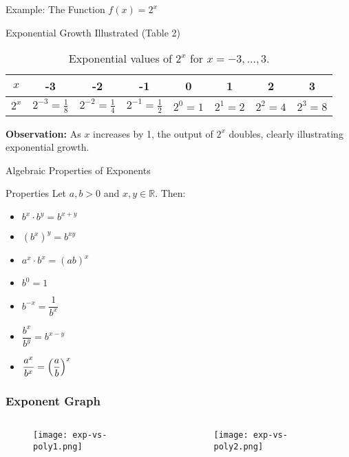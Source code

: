 \begin{frame}{Example: The Function \(f(x)=2^x\)}
  \begin{block}{Exponential Growth Illustrated (Table 2)}
    \begin{table}[ht]
      \centering
      \begin{tabular}{|c|c|c|c|c|c|c|c|}
        \hline
        \(x\)      & -3 & -2 & -1 & 0 & 1 & 2 & 3 \\ \hline
        \(2^x\) & \(2^{-3}=\frac{1}{8}\) & \(2^{-2}=\frac{1}{4}\) & \(2^{-1}=\frac{1}{2}\) & \(2^0=1\) & \(2^1=2\) & \(2^2=4\) & \(2^3=8\) \\ \hline
      \end{tabular}
      \caption{Exponential values of \(2^x\) for \(x=-3,\dots,3\).}
    \end{table}
  \end{block}
  \vspace{1em}
  \textbf{Observation:} As \(x\) increases by 1, the output of \(2^x\) doubles, clearly illustrating exponential growth.
\end{frame}




\begin{frame}{Algebraic Properties of Exponents}
  \begin{block}{Properties}
    Let \(a, b > 0\) and \(x, y \in \mathbb{R}\). Then:
    \begin{itemize}
      \item \(b^x \cdot b^y = b^{x+y}\)
      \item \((b^x)^y = b^{xy}\)
      \item \(a^x \cdot b^x = (ab)^x\)
      \item \(b^0 = 1\)
      \item \(b^{-x} = \dfrac{1}{b^x}\)
      \item \(\dfrac{b^x}{b^y} = b^{x-y}\)
      \item \(\dfrac{a^x}{b^x} = \Bigl(\dfrac{a}{b}\Bigr)^x\)
    \end{itemize}
  \end{block}
\end{frame}

\begin{frame}
  \frametitle{Exponent Graph}
  \begin{columns}
    \begin{column}{0.5\textwidth}
      \begin{figure}
        \centering 
        \texttt{[image: exp-vs-poly1.png]}
       \end{figure}      
    \end{column}
 

    \begin{column}{0.5\textwidth}
      \begin{figure}
        \centering 
        \texttt{[image: exp-vs-poly2.png]}
       \end{figure}      
    \end{column}
  \end{columns}
\end{frame}


